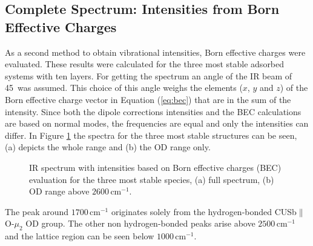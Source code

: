 \documentclass[11pt,DIV=13,BCOR=5mm,a4paper,headinclude]{scrbook}
\begin{document}
\subsection{Complete Spectrum: Intensities from Born Effective Charges}\label{bec}
As a second method to obtain vibrational intensities, Born effective charges were evaluated.
These results were calculated for the three most stable adsorbed systems with ten layers.
For getting the spectrum an angle of the IR beam of 45\textdegree~was assumed.
This choice of this angle weighs the elements ($x$, $y$ and $z$) of the Born effective charge vector in Equation (\ref{eq:bec}) that are in the sum of the intensity.
Since both the dipole corrections intensities and the BEC calculations are based on normal modes, the frequencies are equal and only the intensities can differ.
In Figure \ref{abb:bec} the spectra for the three most stable structures can be seen, (a) depicts the whole range and (b) the OD range only.
\begin{figure}[!h]
    \centering
             \quad
             \caption{IR spectrum with intensities based on Born effective charges (BEC) evaluation for the three most stable species, (a) full spectrum, (b) OD range above $2600\,$cm$^{-1}$.}
            \label{abb:bec}
     \end{figure}
The peak around $1700\,$cm$^{-1}$ originates solely from the hydrogen-bonded CUSb$\parallel$O-$\mu_2$ OD group.
The other non hydrogen-bonded peaks arise above $2500\,$cm$^{-1}$ and the lattice region can be seen below $1000\,$cm$^{-1}$.
\end{document}
